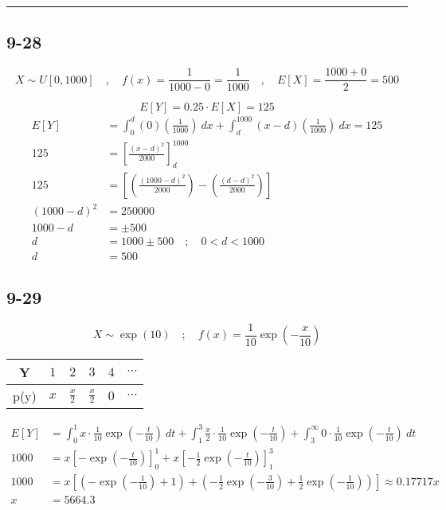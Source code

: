 \documentclass{article}
\newcommand{\qline}{\par\noindent\rule{4.5in}{1pt}}
\begin{document}
	\qline

		\subsection*{9-28}

			\[
				X \sim U[0, 1000] \quad,\quad f(x) = \frac{1}{1000 - 0} = \frac{1}{1000} \quad,\quad E[X] = \frac{1000 + 0}{2} = 500
			\]
			\par
			\[
				E[Y] = 0.25 \cdot E[X] = 125
			\]
			\begin{equation*}
				\begin{split}
					E[Y] &= \int_{0}^{d} (0)\left( \frac{1}{1000} \right) \ dx + \int_{d}^{1000} (x - d)\left( \frac{1}{1000} \right) \ dx = 125 \\
					125 &= \left[ \frac{(x-d)^2}{2000} \right]^{1000}_d \\
					125 &= \left[ \left( \frac{(1000-d)^2}{2000} \right) - \left( \frac{(d-d)^2}{2000} \right) \right] \\
					(1000-d)^2 &= 250000 \\
					1000 - d &= \pm 500 \\
					d &= 1000 \pm 500 \quad;\quad 0 < d < 1000 \\
					d &= \boxed{500}
				\end{split}
			\end{equation*}

	\clearpage

		\subsection*{9-29}

			\[
				X \sim \exp(10) \quad;\quad f(x) = \frac{1}{10} \exp(-\frac{x}{10})
			\]

			\begin{center}
				\begin{tabular}{c|c|c|c|c|c}
					Y & $1$ & $2$ & $3$ & $4$ & $\cdots$ \\ \hline
					p(y) & $x$ & $\frac{x}{2}$ & $\frac{x}{2}$ & $0$ & $\cdots$ \\
				\end{tabular}
			\end{center}

			\begin{equation*}
				\begin{split}
					E[Y] &= \int_{0}^{1} x \cdot \frac{1}{10} \exp(-\frac{t}{10}) \ dt + \int_{1}^{3} \frac{x}{2} \cdot \frac{1}{10} \exp(-\frac{t}{10}) + \int_{3}^{\infty} 0 \cdot \frac{1}{10} \exp(-\frac{t}{10}) \ dt \\
					1000 &= x \left[ -\exp\left( -\frac{t}{10} \right) \right]^1_0 + x \left[ -\frac{1}{2} \exp\left( -\frac{t}{10} \right) \right]^3_1 \\
					1000 &= x \left[ \left( -\exp\left( -\frac{1}{10} \right) + 1 \right) + \left( -\frac{1}{2} \exp\left( -\frac{3}{10} \right) + \frac{1}{2} \exp\left( -\frac{1}{10} \right) \right) \right] \approx 0.17717x \\
					x &= \boxed{\num{5664.3}}
				\end{split}
			\end{equation*}
\end{document}
